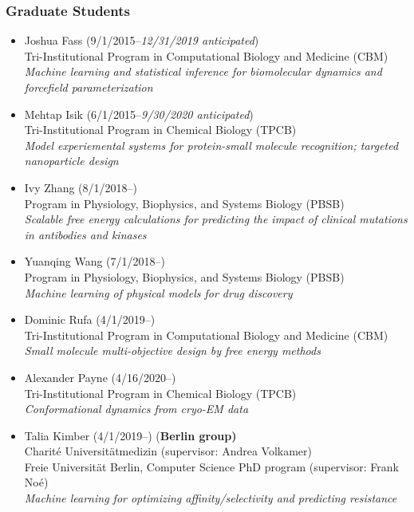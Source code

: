 \documentclass[10pt]{article}
\begin{document}
\subsubsection*{Graduate Students}

\begin{itemize}
  \item Joshua Fass (9/1/2015--\emph{12/31/2019 anticipated})\\
  Tri-Institutional Program in Computational Biology and Medicine (CBM)\\
  \emph{Machine learning and statistical inference for biomolecular dynamics and forcefield parameterization}
  
  \item Mehtap Isik (6/1/2015--\emph{9/30/2020 anticipated})\\
  Tri-Institutional Program in Chemical Biology (TPCB)\\
  \emph{Model experiemental systems for protein-small molecule recognition; targeted nanoparticle design}
  
  \item Ivy Zhang (8/1/2018--)\\
  Program in Physiology, Biophysics, and Systems Biology (PBSB)\\
  \emph{Scalable free energy calculations for predicting the impact of clinical mutations in antibodies and kinases}
  
  \item Yuanqing Wang (7/1/2018--)\\
  Program in Physiology, Biophysics, and Systems Biology (PBSB)\\
  \emph{Machine learning of physical models for drug discovery}
  
  \item Dominic Rufa (4/1/2019--)\\
  Tri-Institutional Program in Computational Biology and Medicine (CBM)\\
  \emph{Small molecule multi-objective design by free energy methods}

  \item Alexander Payne (4/16/2020--)\\
  Tri-Institutional Program in Chemical Biology (TPCB)\\
  \emph{Conformational dynamics from cryo-EM data}
  
  \item Talia Kimber (4/1/2019--) {(\bf Berlin group)}\\
  Charit\'e Universit\"{a}tmedizin (supervisor: Andrea Volkamer)\\
  Freie Universit\"{a}t Berlin, Computer Science PhD program (supervisor: Frank No\'{e})\\
  \emph{Machine learning for optimizing affinity/selectivity and predicting resistance}
  
\end{itemize}
\end{document}
